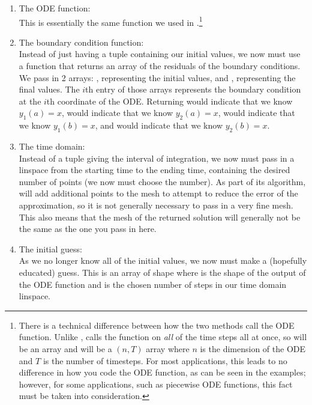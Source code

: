 \begin{enumerate}
    \item The ODE function: \\
    This is essentially the same function we used in .\footnote{There is a technical difference between how the two methods call the ODE function. Unlike ,  calls the function on \emph{all} of the time steps all at once, so  will be an array and  will be a \((n,T)\) array where \(n\) is the dimension of the ODE and \(T\) is the number of timesteps. For most applications, this leads to no difference in how you code the ODE function, as can be seen in the examples; however, for some applications, such as piecewise ODE functions, this fact must be taken into consideration.}
    \item The boundary condition function: \\
    Instead of just having a tuple containing our initial values, we now must use a function that returns an array of the residuals of the boundary conditions.
    We pass in 2 arrays: , representing the initial values, and , representing the final values. The \(i\)th entry of those arrays represents the boundary condition at the \(i\)th coordinate of the ODE.
    Returning  would indicate that we know \(y_1(a)=x\),  would indicate that we know \(y_2(a)=x\),  would indicate that we know \(y_1(b)=x\), and  would indicate that we know \(y_2(b)=x\).
    \item The time domain: \\
    Instead of a tuple giving the interval of integration, we now must pass in a linspace from the starting time to the ending time, containing the desired number of points (we now must choose the number).
    As part of its algorithm,  will add additional points to the mesh to attempt to reduce the error of the approximation, so it is not generally necessary to pass in a very fine mesh.
    This also means that the mesh of the returned solution will generally not be the same as the one you pass in here.
    \item The initial guess: \\
    As we no longer know all of the initial values, we now must make a (hopefully educated) guess. This is an array of shape  where  is the shape of the output of the ODE function and  is the chosen number of steps in our time domain linspace.
\end{enumerate}

